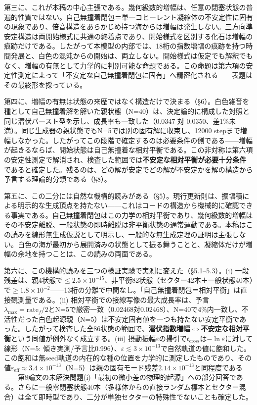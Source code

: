 \documentclass[
  a4paper,
]{ltjsarticle}
\begin{document}
第三に、これが本稿の中心主張である。幾何級数的増幅は、任意の閉塞状態の普遍的性質ではない。自己無撞着閉包＝単一コヒーレント凝縮体の不安定性に固有の現象であり、倍音構造をあらかじめ持つ海からは増幅は発生しない。三方向準安定構造は両開始様式に共通の終着点であり、開始様式を区別する化石は増幅の痕跡だけである。したがって本模型の内部では、18桁の指数増幅の痕跡を持つ時間発展と、白色の混沌からの開始は、両立しない。開始様式は仮定でも解釈でもなく、増幅の有無として力学的に判別可能な命題である。この命題は第六項の安定性測定によって「不安定な自己無撞着閉包に固有」へ精密化される------表題はその最終形を採っている。

第四に、増幅の有無は状態の来歴ではなく構造だけで決まる（§6）。白色雑音を種として自己無撞着解を解いた親状態（N=40）は、決定論的に構成した対照と同じ潜伏バースト型を示し、成長率も一致した（0.0347
対
0.0350、差1\%未満）。同じ生成器の親状態でもN=5では別の固有解に収束し、12000
stepまで増幅しなかった。したがってこの段階で確定するのは必要条件の側である------増幅が起きるならば、開始状態は自己無撞着な相対平衡である。この非対称は第六項の安定性測定で解消され、検査した範囲では\textbf{不安定な相対平衡が必要十分条件}であると確定した。残るのは、どの解が安定でどの解が不安定かを解の構造から予言する理論的分類である（§8）。

第五に、この二分には自然な機構的読みがある（§5）。現行更新則は、振幅積による明示的な生成頂点を持たない------これはコードの構造から機械的に確認できる事実である。自己無撞着閉包はこの力学の相対平衡であり、幾何級数的増幅はその不安定離脱、一般状態の即時離脱は非平衡状態の通常運動である。本稿はこの読みを線形無生成仮説として明示し、一般的な無生成定理の証明は主張しない。白色の海が最初から展開済みの状態として振る舞うことと、凝縮体だけが増幅の余地を持つことは、この読みの両面である。

第六に、この機構的読みを三つの検証実験で実測に変えた（§5.1--5.3）。(i)
一段残差は、親4状態で\(\le2.5\times10^{-15}\)、非平衡82状態（セクター42本＋一般状態40本）で\(\ge1.8\times10^{-2}\)------13桁の分離で中間なし。「自己無撞着閉包＝相対平衡」は直接観測量である。(ii)
相対平衡での接線写像の最大成長率は、予言\(\lambda_{\max}=\text{rate}_f/2\)とN=5で厳密一致（0.02468対0.02468）、N=40で4\%内一致し、不活性だった白色起源親（N=5）は不安定固有値を一つも持たない安定平衡であった。したがって検査した全86状態の範囲で、\textbf{潜伏指数増幅\(\iff\)不安定な相対平衡}という同値が例外なく成立する。(iii)
摂動振幅\(\varepsilon\)の掃引で\(t_{\mathrm{cross}}\)は\(-\ln\varepsilon\)に対して線形（N=5:
傾き実測/予言比0.996）、\(\varepsilon\lesssim3\times10^{-13}\)で自然軌道の値に飽和した。この飽和は無seed軌道の内在的な種の位置を力学的に測定したものであり、その値\(\varepsilon_{\mathrm{eff}}\approx3.4\times10^{-13}\)（N=5）は親の固有モード残差\(2.14\times10^{-13}\)と同程度である------第8論文の未解決問題(i)「最初の微小差の物理的起源」への部分回答である。さらに一般零閉塞状態40本（多様体からの直接ランダム標本とセクター混合）は全て即時型であり、二分が単独セクターの特殊性でないことも確定した。
\end{document}
